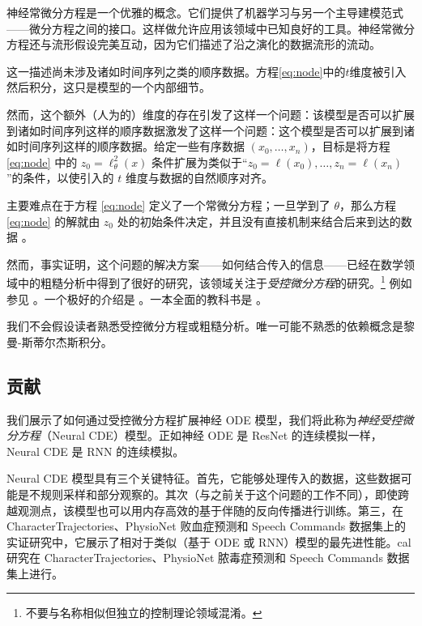 \documentclass{ctexart}
\theoremstyle{plain}
\theoremstyle{definition}
\begin{document}
	神经常微分方程是一个优雅的概念。它们提供了机器学习与另一个主导建模范式——微分方程之间的接口。这样做允许应用该领域中已知良好的工具。神经常微分方程还与流形假设完美互动，因为它们描述了沿之演化的数据流形的流动。
	
	这一描述尚未涉及诸如时间序列之类的顺序数据。方程\eqref{eq:node}中的$t$维度被引入然后积分，这只是模型的一个内部细节。
	
	然而，这个额外（人为的）维度的存在引发了这样一个问题：该模型是否可以扩展到诸如时间序列这样的顺序数据激发了这样一个问题：这个模型是否可以扩展到诸如时间序列这样的顺序数据。给定一些有序数据 $(x_0, \ldots, x_n)$，目标是将方程 \eqref{eq:node} 中的 $z_0 = \ell^2_\theta(x)$ 条件扩展为类似于“$z_0 = \ell(x_0), \ldots, z_n = \ell(x_n)$”的条件，以使引入的 $t$ 维度与数据的自然顺序对齐。

主要难点在于方程 \eqref{eq:node} 定义了一个常微分方程；一旦学到了 $\theta$，那么方程 \eqref{eq:node} 的解就由 $z_0$ 处的初始条件决定，并且没有直接机制来结合后来到达的数据 \cite{nais-net}。%


然而，事实证明，这个问题的解决方案——如何结合传入的信息——已经在数学领域中的粗糙分析中得到了很好的研究，该领域关注于\emph{受控微分方程}的研究。\footnote{不要与名称相似但独立的控制理论领域混淆。} 例如参见 \cite{lyons1998differential, lyons2014rough, hambly2010uniqueness, chevyrev2018signature}。一个极好的介绍是 \cite{levy-lyons}。一本全面的教科书是 \cite{FritzVictoir10}。

我们不会假设读者熟悉受控微分方程或粗糙分析。唯一可能不熟悉的依赖概念是黎曼-斯蒂尔杰斯积分。

\subsection{贡献}
我们展示了如何通过受控微分方程扩展神经 ODE 模型，我们将此称为\emph{神经受控微分方程}（Neural CDE）模型。正如神经 ODE 是 ResNet 的连续模拟一样，Neural CDE 是 RNN 的连续模拟。

Neural CDE 模型具有三个关键特征。首先，它能够处理传入的数据，这些数据可能是不规则采样和部分观察的。其次（与之前关于这个问题的工作不同），即使跨越观测点，该模型也可以用内存高效的基于伴随的反向传播进行训练。第三，在 CharacterTrajectories、PhysioNet 败血症预测和 Speech Commands 数据集上的实证研究中，它展示了相对于类似（基于 ODE 或 RNN）模型的最先进性能。cal 研究在 CharacterTrajectories、PhysioNet 脓毒症预测和 Speech Commands 数据集上进行。
\end{document}
